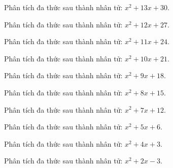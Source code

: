 \begin{bt}
	Phân tích đa thức sau thành nhân tử: $x^2 + 13 x + 30$.
\end{bt}
\begin{bt}
	Phân tích đa thức sau thành nhân tử: $x^2 + 12 x + 27$.
\end{bt}
\begin{bt}
	Phân tích đa thức sau thành nhân tử: $x^2 + 11 x + 24$.
\end{bt}
\begin{bt}
	Phân tích đa thức sau thành nhân tử: $x^2 + 10 x + 21$.
\end{bt}
\begin{bt}
	Phân tích đa thức sau thành nhân tử: $x^2 + 9 x + 18$.
\end{bt}
\begin{bt}
	Phân tích đa thức sau thành nhân tử: $x^2 + 8 x + 15$.
\end{bt}
\begin{bt}
	Phân tích đa thức sau thành nhân tử: $x^2 + 7 x + 12$.
\end{bt}
\begin{bt}
	Phân tích đa thức sau thành nhân tử: $x^2 + 5 x + 6$.
\end{bt}
\begin{bt}
	Phân tích đa thức sau thành nhân tử: $x^2 + 4 x + 3$.
\end{bt}
\begin{bt}
	Phân tích đa thức sau thành nhân tử: $x^2 + 2 x - 3$.
\end{bt}
